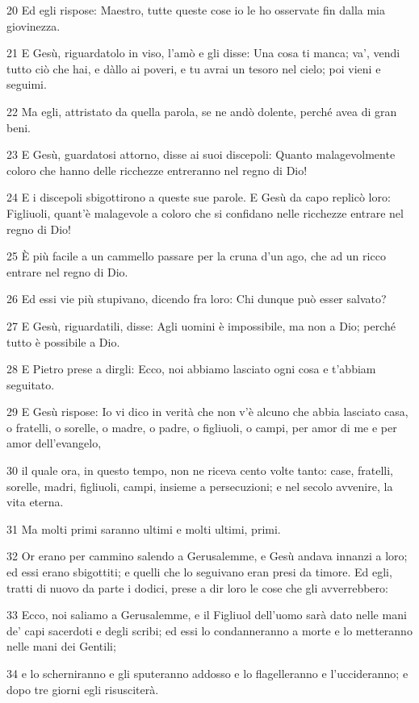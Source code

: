 \par 20 Ed egli rispose: Maestro, tutte queste cose io le ho osservate fin dalla mia giovinezza.
\par 21 E Gesù, riguardatolo in viso, l'amò e gli disse: Una cosa ti manca; va', vendi tutto ciò che hai, e dàllo ai poveri, e tu avrai un tesoro nel cielo; poi vieni e seguimi.
\par 22 Ma egli, attristato da quella parola, se ne andò dolente, perché avea di gran beni.
\par 23 E Gesù, guardatosi attorno, disse ai suoi discepoli: Quanto malagevolmente coloro che hanno delle ricchezze entreranno nel regno di Dio!
\par 24 E i discepoli sbigottirono a queste sue parole. E Gesù da capo replicò loro: Figliuoli, quant'è malagevole a coloro che si confidano nelle ricchezze entrare nel regno di Dio!
\par 25 È più facile a un cammello passare per la cruna d'un ago, che ad un ricco entrare nel regno di Dio.
\par 26 Ed essi vie più stupivano, dicendo fra loro: Chi dunque può esser salvato?
\par 27 E Gesù, riguardatili, disse: Agli uomini è impossibile, ma non a Dio; perché tutto è possibile a Dio.
\par 28 E Pietro prese a dirgli: Ecco, noi abbiamo lasciato ogni cosa e t'abbiam seguitato.
\par 29 E Gesù rispose: Io vi dico in verità che non v'è alcuno che abbia lasciato casa, o fratelli, o sorelle, o madre, o padre, o figliuoli, o campi, per amor di me e per amor dell'evangelo,
\par 30 il quale ora, in questo tempo, non ne riceva cento volte tanto: case, fratelli, sorelle, madri, figliuoli, campi, insieme a persecuzioni; e nel secolo avvenire, la vita eterna.
\par 31 Ma molti primi saranno ultimi e molti ultimi, primi.
\par 32 Or erano per cammino salendo a Gerusalemme, e Gesù andava innanzi a loro; ed essi erano sbigottiti; e quelli che lo seguivano eran presi da timore. Ed egli, tratti di nuovo da parte i dodici, prese a dir loro le cose che gli avverrebbero:
\par 33 Ecco, noi saliamo a Gerusalemme, e il Figliuol dell'uomo sarà dato nelle mani de' capi sacerdoti e degli scribi; ed essi lo condanneranno a morte e lo metteranno nelle mani dei Gentili;
\par 34 e lo scherniranno e gli sputeranno addosso e lo flagelleranno e l'uccideranno; e dopo tre giorni egli risusciterà.

